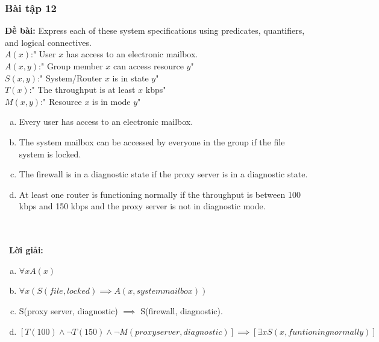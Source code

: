 \documentclass[a4paper]{article}
\begin{document}
\subsubsection{Bài tập 12} 
\textbf{Đề bài:} Express each of these system specifications using predicates, quantifiers, and logical connectives.\\
$A(x)$:" User $x$ has access to an electronic mailbox.\\
$A(x,y)$:" Group member $x$ can access resource $y$"\\
$S(x,y)$:" System/Router $x$ is in state $y$"\\
$T(x)$:" The throughput is at least $x$ kbps"\\
$M(x,y)$:" Resource $x$ is in mode $y$"
\begin{enumerate}[a)]
	\item Every user has access to an electronic mailbox.
	\item The system mailbox can be accessed by everyone in the group if the file system is locked.
	\item The firewall is in a diagnostic state if the proxy server is in a diagnostic state.
	\item At least one router is functioning normally if the throughput is between 100 kbps and 150 kbps and the proxy server is not in diagnostic mode.
	\end{enumerate}
\\\ \\\
\textbf{Lời giải:} \begin{enumerate}[a)]
	\item $\forall x A(x)$
	\item $\forall x (S(file,locked) \implies A(x,system mailbox))$
	\item S(proxy server, diagnostic) $\implies $ S(firewall, diagnostic).
	\item $[T(100) \land \lnot T(150) \land \lnot M(proxy server, diagnostic)] \implies [\exists x S(x, funtioning normally)]$
	\end{enumerate} \\\ \\\
\clearpage
\end{document}
